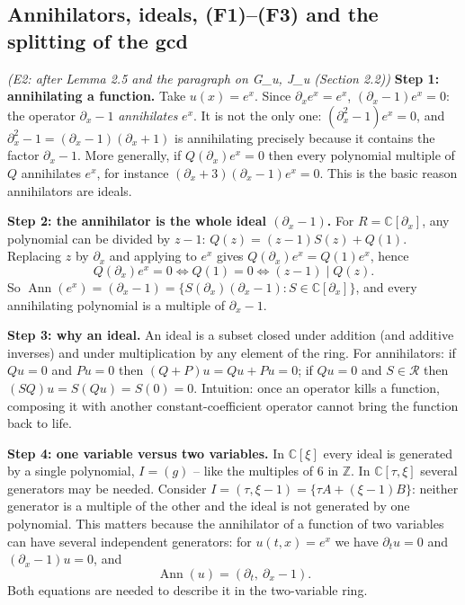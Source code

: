 \documentclass[11pt]{article}
\theoremstyle{plain}
\theoremstyle{definition}
\theoremstyle{remark}
\newcommand{\C}{\mathbb{C}}
\newcommand{\Z}{\mathbb{Z}}
\newcommand{\ring}{\mathcal{R}}            %
\DeclareMathOperator{\Ann}{Ann}             %
\begin{document}
\subsection{Annihilators, ideals, (F1)--(F3) and the splitting of the gcd}\label{expl:E2}
\noindent\emph{(E2: after Lemma 2.5 and the paragraph on G\_u, J\_u (Section 2.2))}
\textbf{Step 1: annihilating a function.} Take $u(x)=e^{x}$. Since $\partial_xe^x=e^x$, $(\partial_x-1)e^x=0$: the operator $\partial_x-1$ \emph{annihilates} $e^x$. It is not the only one: $(\partial_x^2-1)e^x=0$, and $\partial_x^2-1=(\partial_x-1)(\partial_x+1)$ is annihilating precisely because it contains the factor $\partial_x-1$. More generally, if $Q(\partial_x)e^x=0$ then every polynomial multiple of $Q$ annihilates $e^x$, for instance $(\partial_x+3)(\partial_x-1)e^x=0$. This is the basic reason annihilators are ideals.

\medskip\textbf{Step 2: the annihilator is the whole ideal $(\partial_x-1)$.} For $R=\C[\partial_x]$, any polynomial can be divided by $z-1$: $Q(z)=(z-1)S(z)+Q(1)$. Replacing $z$ by $\partial_x$ and applying to $e^x$ gives $Q(\partial_x)e^x=Q(1)e^x$, hence
\[
Q(\partial_x)e^x=0\iff Q(1)=0\iff(z-1)\mid Q(z).
\]
So $\Ann(e^x)=(\partial_x-1)=\{S(\partial_x)(\partial_x-1):S\in\C[\partial_x]\}$, and every annihilating polynomial is a multiple of $\partial_x-1$.

\medskip\textbf{Step 3: why an ideal.} An ideal is a subset closed under addition (and additive inverses) and under multiplication by any element of the ring. For annihilators: if $Qu=0$ and $Pu=0$ then $(Q+P)u=Qu+Pu=0$; if $Qu=0$ and $S\in\ring$ then $(SQ)u=S(Qu)=S(0)=0$. Intuition: once an operator kills a function, composing it with another constant-coefficient operator cannot bring the function back to life.

\medskip\textbf{Step 4: one variable versus two variables.} In $\C[\xi]$ every ideal is generated by a single polynomial, $I=(g)$ -- like the multiples of $6$ in $\Z$. In $\C[\tau,\xi]$ several generators may be needed. Consider $I=(\tau,\xi-1)=\{\tau A+(\xi-1)B\}$: neither generator is a multiple of the other and the ideal is not generated by one polynomial. This matters because the annihilator of a function of two variables can have several independent generators: for $u(t,x)=e^x$ we have $\partial_tu=0$ and $(\partial_x-1)u=0$, and
\[
\Ann(u)=(\partial_t,\ \partial_x-1).
\]
Both equations are needed to describe it in the two-variable ring.
\end{document}
